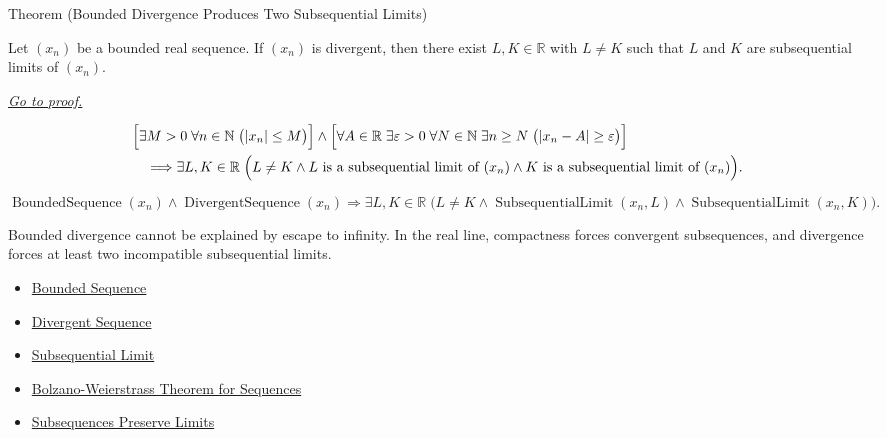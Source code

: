 
\begin{theorembox}{Theorem (Bounded Divergence Produces Two Subsequential Limits)}
\begin{theorem}
\label{thm:bounded-divergence-produces-two-subsequential-limits}
Let $(x_n)$ be a bounded real sequence. If $(x_n)$ is divergent, then
there exist $L,K\in\mathbb{R}$ with $L\ne K$ such that $L$ and $K$ are
subsequential limits of $(x_n)$.

\smallskip
\noindent
\hyperref[prf:bounded-divergence-produces-two-subsequential-limits]{\textit{Go to proof.}}
\end{theorem}
\end{theorembox}

\begin{remark*}
\[
\begin{aligned}
&\Bigl[
  \exists M>0\;\forall n\in\mathbb{N}\;\bigl(|x_n|\le M\bigr)
\Bigr]
\land
\Bigl[
  \forall A\in\mathbb{R}\;\exists \varepsilon>0\;\forall N\in\mathbb{N}
  \;\exists n\ge N\;\bigl(|x_n-A|\ge\varepsilon\bigr)
\Bigr]\\
&\quad\Longrightarrow
\exists L,K\in\mathbb{R}\;
\Bigl(
  L\ne K
  \land L\text{ is a subsequential limit of }(x_n)
  \land K\text{ is a subsequential limit of }(x_n)
\Bigr).
\end{aligned}
\]
\end{remark*}

\begin{remark*}
\[
\operatorname{BoundedSequence}(x_n)
\land
\operatorname{DivergentSequence}(x_n)
\Longrightarrow
\exists L,K\in\mathbb{R}\;
\bigl(
  L\ne K
  \land \operatorname{SubsequentialLimit}(x_n,L)
  \land \operatorname{SubsequentialLimit}(x_n,K)
\bigr).
\]
\end{remark*}

\begin{remark*}[Interpretation]
Bounded divergence cannot be explained by escape to infinity. In the real
line, compactness forces convergent subsequences, and divergence forces at
least two incompatible subsequential limits.
\end{remark*}

\begin{dependencies}
\begin{itemize}
  \item \hyperref[def:bounded-sequence]{Bounded Sequence}
  \item \hyperref[def:divergent-sequence]{Divergent Sequence}
  \item \hyperref[def:subsequential-limit]{Subsequential Limit}
  \item \hyperref[thm:bolzano-weierstrass-sequences]{Bolzano-Weierstrass Theorem for Sequences}
  \item \hyperref[thm:subsequences-preserve-limits]{Subsequences Preserve Limits}
\end{itemize}
\end{dependencies}